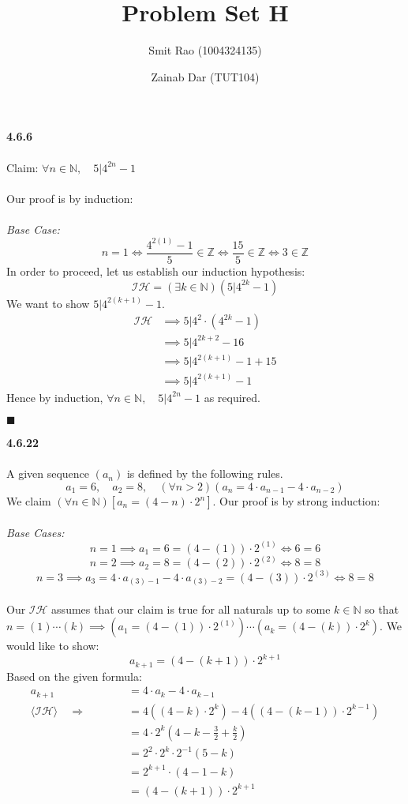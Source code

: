 \documentclass[12pt]{article}
\title{Problem Set H}
\author{Smit Rao (1004324135) \and Zainab Dar (TUT104)}
\begin{document}
\maketitle
\parindent=0pt
\textbf{4.6.6}\\\\
Claim: $\forall n \in \mathbb{N}, \quad 5|4^{2n}-1$\\\\
Our proof is by induction:\\\\
\emph{Base Case:}
$$n=1 \iff \frac{4^{2(1)}-1}{5} \in \mathbb{Z} \iff \frac{15}{5} \in \mathbb{Z} \iff 3 \in \mathbb{Z}$$
In order to proceed, let us establish our induction hypothesis:
$$\mathcal{IH} = (\exists k \in \mathbb{N})(5|4^{2k}-1)$$
We want to show $5|4^{2(k+1)}-1$.
\begin{align}
\mathcal{IH} &\implies 5|4^2 \cdot (4^{2k}-1)\\
&\implies 5|4^{2k+2}-16\\
&\implies 5|4^{2(k+1)}-1+15\\
&\implies 5|4^{2(k+1)}-1
\end{align}
Hence by induction, $\forall n \in \mathbb{N}, \quad 5|4^{2n}-1$ as required.
\begin{flushright}
$\blacksquare$
\end{flushright}
\pagebreak
\textbf{4.6.22}\\\\
A given sequence $(a_n)$ is defined by the following rules. 
$$a_1 = 6, \quad a_2 = 8, \quad (\forall n > 2)(a_n = 4 \cdot a_{n-1} - 4 \cdot a_{n-2})$$
We claim $( \forall n \in \mathbb{N})[a_n = (4-n) \cdot 2^n]$. Our proof is by strong induction:\\\\
\emph{Base Cases:}
$$\boxed{n=1 \implies a_1 = 6 = (4-(1)) \cdot 2^{(1)} \iff 6 = 6}$$
$$\boxed{n=2 \implies a_2 = 8 = (4-(2)) \cdot 2^{(2)} \iff 8 = 8}$$
$$\boxed{n=3 \implies a_3 = 4 \cdot a_{(3)-1}-4 \cdot a_{(3)-2} = (4-(3)) \cdot 2^{(3)} \iff 8=8}$$
\quad\\
Our $\mathcal{IH}$ assumes that our claim is true for all naturals up to some $k \in \mathbb{N}$ so that $n = (1) \cdots (k) \implies (a_1 = (4-(1)) \cdot 2^{(1)}) \cdots (a_k = (4-(k)) \cdot 2^{k})$. We would like to show:
$$a_{k+1} = (4-(k+1)) \cdot 2^{k+1}$$
Based on the given formula:
\begin{align*}
a_{k+1} &= 4 \cdot a_k - 4 \cdot a_{k-1}\\
\langle \mathcal{IH} \rangle \quad\Rightarrow\quad\quad\quad &= 4((4-k) \cdot 2^k)-4((4-(k-1)) \cdot 2^{k-1})\\
&= 4 \cdot 2^k \left(4-k-\frac{3}{2}+\frac{k}{2} \right)\\
&= 2^2 \cdot 2^k \cdot 2^{-1}(5-k)\\
&= 2^{k+1} \cdot (4-1-k)\\
&= (4-(k+1)) \cdot 2^{k+1}
\end{align*}
\end{document}
